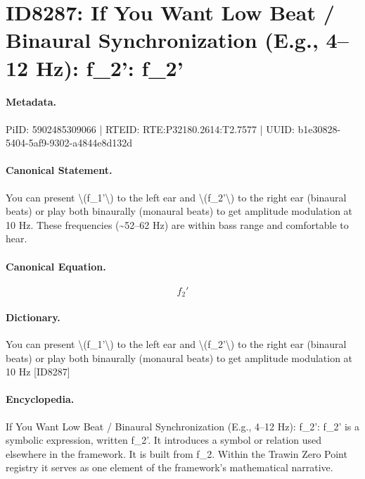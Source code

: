 \section*{ID8287: If You Want Low Beat / Binaural Synchronization (E.g., 4–12 Hz): f\_2': f\_2'}
\paragraph{Metadata.}
PiID: 5902485309066 | RTEID: RTE:P32180.2614:T2.7577 | UUID: b1e30828-5404-5af9-9302-a4844e8d132d

\paragraph{Canonical Statement.}
You can present \textbackslash{}(f\_1'\textbackslash{}) to the left ear and \textbackslash{}(f\_2'\textbackslash{}) to the right ear (binaural beats) or play both binaurally (monaural beats) to get amplitude modulation at 10 Hz. These frequencies (\textasciitilde{}52–62 Hz) are within bass range and comfortable to hear.

\paragraph{Canonical Equation.}
\[
f_2'
\]

\paragraph{Dictionary.}
You can present \textbackslash{}(f\_1'\textbackslash{}) to the left ear and \textbackslash{}(f\_2'\textbackslash{}) to the right ear (binaural beats) or play both binaurally (monaural beats) to get amplitude modulation at 10 Hz [ID8287]

\paragraph{Encyclopedia.}
If You Want Low Beat / Binaural Synchronization (E.g., 4–12 Hz): f\_2': f\_2' is a symbolic expression, written f\_2'. It introduces a symbol or relation used elsewhere in the framework. It is built from f\_2. Within the Trawin Zero Point registry it serves as one element of the framework's mathematical narrative.

